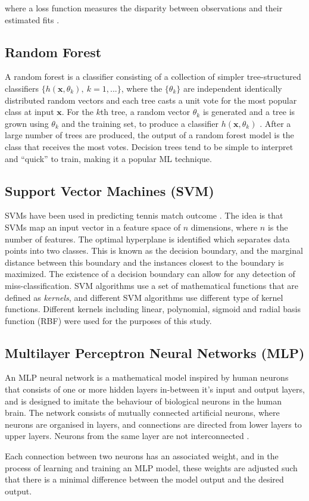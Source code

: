 where a loss function measures the disparity between observations and their estimated fits \cite{hazan2014logistic}.

\subsection{Random Forest}
A random forest is a classifier consisting of a collection of simpler tree-structured classifiers $\{h(\textbf{x},\theta_k),\ k=1,...\}$, where the $\{\theta_k\}$ are independent identically distributed random vectors and each tree casts a unit vote for the most popular class at input $\textbf{x}$. For the $k$th tree, a random vector $\theta_k$ is generated and a tree is grown using $\theta_k$ and the training set, to produce a classifier $h(\textbf{x}, \theta_k)$ \cite{breiman2001random}. After a large number of trees are produced, the output of a random forest model is the class that receives the most votes. Decision trees tend to be simple to interpret and ``quick'' to train, making it a popular ML technique.

\subsection{Support Vector Machines (SVM)}
SVMs have been used in predicting tennis match outcome \cite{cornman2017machine}. The idea is that SVMs map an input vector in a feature space of $n$ dimensions, where $n$ is the number of features. The optimal hyperplane is identified which separates data points into two classes. This is known as the decision boundary, and the marginal distance between this boundary and the instances closest to the boundary is maximized. The existence of a decision boundary can allow for any detection of miss-classification. SVM algorithms use a set of mathematical functions that are defined as \textit{kernels}, and different SVM algorithms use different type of kernel functions. Different kernels including linear, polynomial, sigmoid and radial basis function (RBF) were used for the purposes of this study.

\subsection{Multilayer Perceptron Neural Networks (MLP)}
An MLP neural network is a mathematical model inspired by human neurons that consists of one or more hidden layers in-between it's input and output layers, and is designed to imitate the behaviour of biological neurons in the human brain. The network consists of mutually connected artificial neurons, where neurons are organised in layers, and connections are directed from lower layers to upper layers. Neurons from the same layer are not interconnected \cite{noriega2005multilayer}.

Each connection between two neurons has an associated weight, and in the process of learning and training an MLP model, these weights are adjusted such that there is a minimal difference between the model output and the desired output. 
